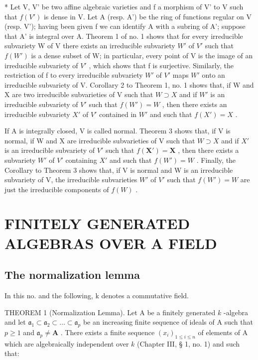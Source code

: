 * Let V, V' be two affine algebraic varieties and f a morphism of V' to V such that \(f(V')\) is dense in V. Let A (resp. A') be the ring of functions regular on V (resp. V'); having been given f we can identify A with a subring of A'; suppose that A' is integral over A. Theorem 1 of no. 1 shows that for every irreducible subvariety W of V there exists an irreducible subvariety \(W'\) of \(V'\) such that \(f(W')\) is a dense subset of W; in particular, every point of V is the image of an irreducible subvariety of \(V'\) , which shows that f is surjective. Similarly, the restriction of f to every irreducible subvariety \(W'\) of \(V'\) maps \(W'\) onto an irreducible subvariety of V. Corollary 2 to Theorem 1, no. 1 shows that, if W and X are two irreducible subvarieties of V such that \(W \supset X\) and if \(W'\) is an irreducible subvariety of \(V'\) such that \(f(W') = W\) , then there exists an irreducible subvariety \(X'\) of \(V'\) contained in \(W'\) and such that \(f(X') = X\) .

If A is integrally closed, V is called normal. Theorem 3 shows that, if V is normal, if W and X are irreducible subvarieties of V such that \(W \supset X\) and if \(X'\) is an irreducible subvariety of \(V'\) such that \(f(\mathbf{X}') = \mathbf{X}\) , then there exists a subvariety \(W'\) of \(V'\) containing \(X'\) and such that \(f(W') = W\) . Finally, the Corollary to Theorem 3 shows that, if V is normal and W is an irreducible subvariety of V, the irreducible subvarieties \(W'\) of \(V'\) such that \(f(W') = W\) are just the irreducible components of \(f(W)\) .

\section{FINITELY GENERATED ALGEBRAS OVER A FIELD}

\subsection{The normalization lemma}

In this no. and the following, k denotes a commutative field.

THEOREM 1 (Normalization Lemma). Let A be a finitely generated \(k\) -algebra and let \(\mathfrak{a}_1 \subset \mathfrak{a}_2 \subset \ldots \subset \mathfrak{a}_p\) be an increasing finite sequence of ideals of A such that \(p \geqslant 1\) and \(\mathfrak{a}_p \neq \mathbf{A}\) . There exists a finite sequence \((x_i)_{1 \leqslant i \leqslant n}\) of elements of A which are algebraically independent over \(k\) (Chapter III, § 1, no. 1) and such that:

